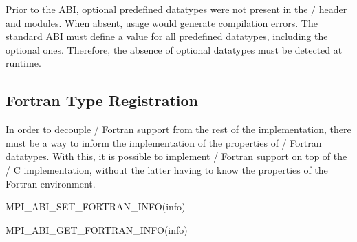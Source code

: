 \begin{rationale}
Prior to the ABI, optional predefined datatypes were not present in the \MPI/ header and modules.
When absent, usage would generate compilation errors.
The standard ABI must define a value for all predefined datatypes, including the optional ones.
Therefore, the absence of optional datatypes must be detected at runtime.
\end{rationale}

\subsection{Fortran Type Registration}
\label{subsec:fortran-type-registration}

In order to decouple \MPI/ Fortran support from the rest of the implementation,
there must be a way to inform the implementation of the properties of
\MPI/ Fortran datatypes.
With this, it is possible to implement \MPI/ Fortran support on top
of the \MPI/ C implementation, without the latter having to know the
properties of the Fortran environment.

\begin{funcdef}{MPI\_ABI\_SET\_FORTRAN\_INFO}{(\mbox{info})}
\end{funcdef}

\begin{funcdef}{MPI\_ABI\_GET\_FORTRAN\_INFO}{(\mbox{info})}
\end{funcdef}

